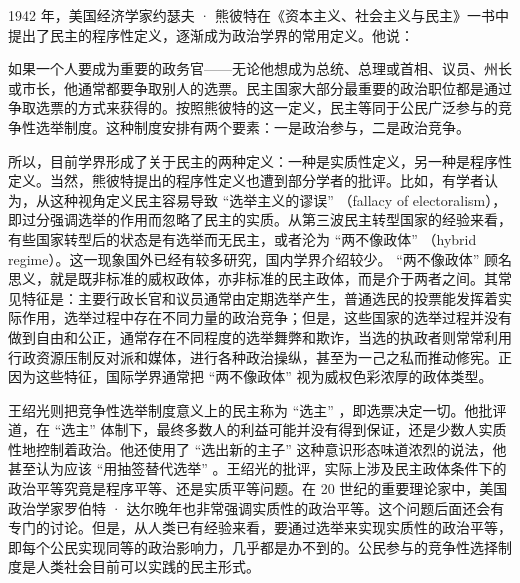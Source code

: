 1942 年，美国经济学家约瑟夫 · 熊彼特在《资本主义、社会主义与民主》一书中提出了民主的程序性定义，逐渐成为政治学界的常用定义。他说：


如果一个人要成为重要的政务官——无论他想成为总统、总理或首相、议员、州长或市长，他通常都要争取别人的选票。民主国家大部分最重要的政治职位都是通过争取选票的方式来获得的。按照熊彼特的这一定义，民主等同于公民广泛参与的竞争性选举制度。这种制度安排有两个要素：一是政治参与，二是政治竞争。

所以，目前学界形成了关于民主的两种定义：一种是实质性定义，另一种是程序性定义。当然，熊彼特提出的程序性定义也遭到部分学者的批评。比如，有学者认为，从这种视角定义民主容易导致 “选举主义的谬误” （fallacy of electoralism），即过分强调选举的作用而忽略了民主的实质。从第三波民主转型国家的经验来看，有些国家转型后的状态是有选举而无民主，或者沦为 “两不像政体” （hybrid regime）。这一现象国外已经有较多研究，国内学界介绍较少。 “两不像政体” 顾名思义，就是既非标准的威权政体，亦非标准的民主政体，而是介于两者之间。其常见特征是：主要行政长官和议员通常由定期选举产生，普通选民的投票能发挥着实际作用，选举过程中存在不同力量的政治竞争；但是，这些国家的选举过程并没有做到自由和公正，通常存在不同程度的选举舞弊和欺诈，当选的执政者则常常利用行政资源压制反对派和媒体，进行各种政治操纵，甚至为一己之私而推动修宪。正因为这些特征，国际学界通常把 “两不像政体” 视为威权色彩浓厚的政体类型。

王绍光则把竞争性选举制度意义上的民主称为 “选主” ，即选票决定一切。他批评道，在 “选主” 体制下，最终多数人的利益可能并没有得到保证，还是少数人实质性地控制着政治。他还使用了 “选出新的主子” 这种意识形态味道浓烈的说法，他甚至认为应该 “用抽签替代选举” 。王绍光的批评，实际上涉及民主政体条件下的政治平等究竟是程序平等、还是实质平等问题。在 20 世纪的重要理论家中，美国政治学家罗伯特 · 达尔晚年也非常强调实质性的政治平等。这个问题后面还会有专门的讨论。但是，从人类已有经验来看，要通过选举来实现实质性的政治平等，即每个公民实现同等的政治影响力，几乎都是办不到的。公民参与的竞争性选择制度是人类社会目前可以实践的民主形式。


